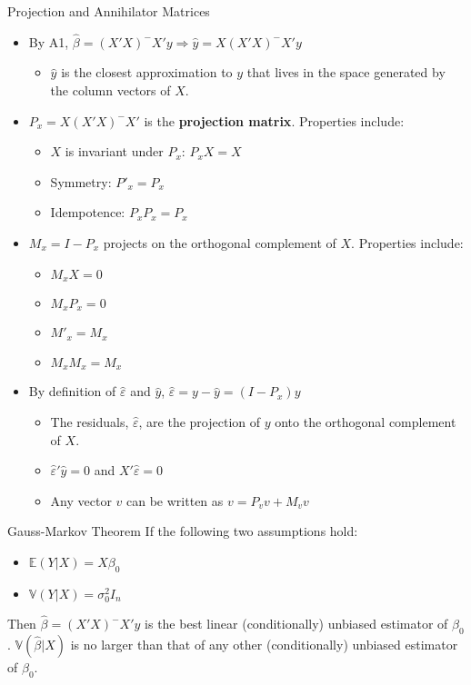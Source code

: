 \documentclass[fleqn, 10pt]{beamer}
\begin{document}
\begin{frame}{Projection and Annihilator Matrices}
	
	\begin{itemize}
		\item By A1, $\hat{\beta}=(X'X)^-X'y \Rightarrow \hat{y}=X(X'X)^-X'y$
		\begin{itemize}
			\item $\hat{y}$ is the closest approximation to $y$ that lives in the space generated by the column vectors of $X$.
		\end{itemize}
		\item $P_x = X(X'X)^-X'$ is the \textbf{projection matrix}. Properties include:
		\begin{itemize}
			\item $X$ is invariant under $P_x$: $P_x X=X$
			\item Symmetry: $P'_x=P_x $
			\item Idempotence: $P_x P_x = P_x $ 
		\end{itemize}
		\item $M_x = I-P_x$ projects on the orthogonal complement of $X$. Properties include:
		\begin{itemize}
			\item $M_x X=0$
			\item $M_x P_x=0$
			\item $M'_x = M_x $
			\item $M_xM_x=M_x$
		\end{itemize}
		\item By definition of $\hat\varepsilon$ and $\hat{y}$, $\hat\varepsilon = y-\hat{y}=(I-P_x)y $
		\begin{itemize}
			\item The residuals, $\hat{\varepsilon}$, are the projection of $y$ onto the orthogonal complement of $X$. 
			\item $\hat{\varepsilon}'\hat{y}=0 $ and $X'\hat{\varepsilon}=0$
			\item Any vector $v$ can be written as $v=P_v v + M_v v$
		\end{itemize}	
	\end{itemize}
	
\end{frame}

\begin{frame}{Gauss-Markov Theorem}
If the following two assumptions hold:		
	\begin{itemize}
		\item $\mathbb{E}(Y|X)=X\beta_0$
		\item $\mathbb{V}(Y|X)=\sigma^2_0I_n$
	\end{itemize}
Then $\hat{\beta}=(X'X)^-X'y$ is the best linear (conditionally) unbiased estimator of $\beta_0$. $\mathbb{V}(\hat{\beta}|X)$ is no larger than that of any other (conditionally) unbiased estimator of $\beta_0$.

\end{frame}
\end{document}
